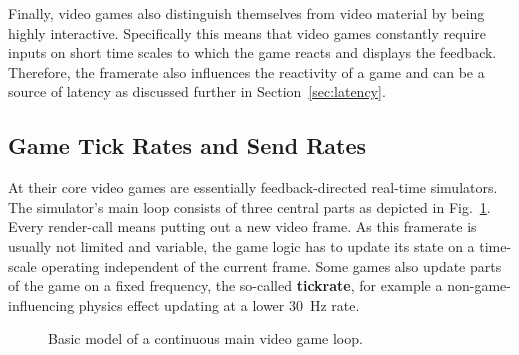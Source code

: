 Finally, video games also distinguish themselves from video material by being highly interactive. Specifically this means that video games constantly require inputs on short time scales to which the game reacts and displays the feedback. Therefore, the framerate also influences the reactivity of a game and can be a source of latency as discussed further in Section~\ref{sec:latency}.


\subsection{Game Tick Rates and Send Rates}

At their core video games are essentially feedback-directed real-time simulators. The simulator's main loop consists of three central parts as depicted in Fig.~\ref{alg:gameloop1}. Every render-call means putting out a new video frame. As this framerate is usually not limited and variable, the game logic has to update its state on a time-scale operating independent of the current frame. Some games also update parts of the game on a fixed frequency, the so-called \textbf{tickrate}, for example a non-game-influencing physics effect updating at a lower \SI{30}{\hertz} rate.


\begin{figure}[!t]
\centering
\removelatexerror
\begin{algorithm}[H]
\end{algorithm}
\caption{Basic model of a continuous main video game loop.}
\label{alg:gameloop1}
\end{figure}

